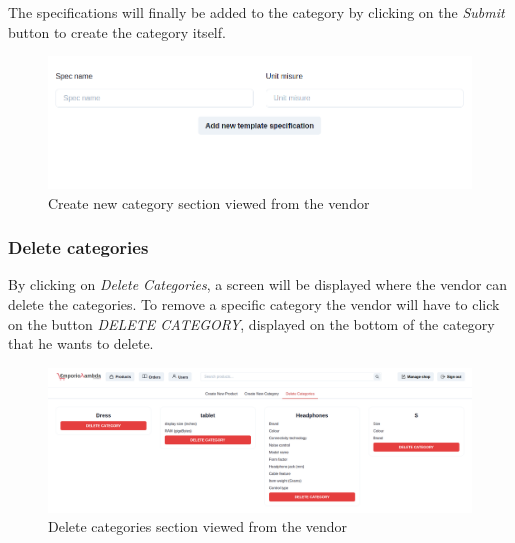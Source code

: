 The specifications will finally be added to the category by clicking on the \textit{Submit} button to create the category itself.
\begin{figure}[!ht]
    \caption{Create new category section viewed from the vendor}
    \vspace{5px}
    \includegraphics[scale=0.25]{../../../../Images/userManual/addSpecificationCategoryVendor.png}
    \centering
\end{figure}
\pagebreak
\subsubsection{Delete categories}
By clicking on \textit{Delete Categories}, a screen will be displayed where the vendor can delete the categories.\linebreak
To remove a specific category the vendor will have to click on the button \textit{DELETE CATEGORY}, displayed on the bottom of the category that he wants to delete.
\begin{figure}[!ht]
    \caption{Delete categories section viewed from the vendor}
    \vspace{5px}
    \includegraphics[scale=0.25]{../../../../Images/userManual/deleteCategoriesVendor.png}
    \centering
\end{figure}
\pagebreak


